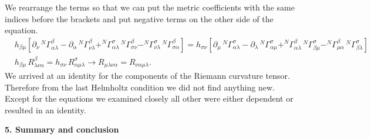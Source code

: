 \documentclass[english]{article}
\begin{document}
We rearrange the terms so that we can put the metric coefficients with the same indices before the brackets and put negative terms on the other side of the equation.
\begin{align*}
&
{\scriptstyle h_{\beta\mu}\left[\partial_\nu\,^N\Gamma^\beta_{\alpha\lambda}-\partial_\alpha\,^N\Gamma^\beta_{\nu\lambda}+^N\Gamma^\sigma_{\alpha\lambda}\,^N\Gamma^\beta_{\sigma\nu}-^N\Gamma^\sigma_{\nu\lambda}\,^N\Gamma^\beta_{\sigma\alpha}\right]=h_{\sigma\nu}\left[\partial_\mu\,^N\Gamma^\sigma_{\alpha\lambda}-\partial_\lambda\,^N\Gamma^\sigma_{\alpha\mu}+^N\Gamma^\beta_{\alpha\lambda}\,^N\Gamma^\sigma_{\beta\mu}-^N\Gamma^\beta_{\mu\alpha}\,^N\Gamma^\sigma_{\beta\lambda}\right]}\\
&h_{\beta\mu}\,R^\beta_{\lambda\nu\alpha}=h_{\sigma\nu}\,R^\sigma_{\alpha\mu\lambda}\longrightarrow R_{\mu\lambda\nu\alpha}=R_{\nu\alpha\mu\lambda}.
\end{align*}
We arrived at an identity for the components of the Riemann curvature tensor. Therefore from the last Helmholtz condition we did not find anything new. Except for the equations we examined closely all other were either dependent or resulted in an identity. 

\begin{center}
{\bf 5. Summary and conclusion}
\end{center}
\end{document}

